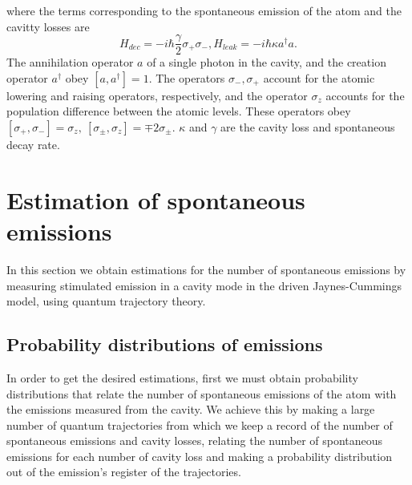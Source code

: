 \documentclass[conference]{IEEEtran}
\begin{document}
where the terms corresponding to the spontaneous emission of the atom and the cavitty losses are
\begin{subequations}
\begin{equation}
H_{dec} = - i\hbar\frac{\gamma}{2}\sigma_+\sigma_-,
\end{equation}
\begin{equation}
H_{leak} = - i\hbar\kappa a^\dagger a.
\end{equation}
\end{subequations}
The annihilation operator $a$ of a single photon in the cavity, and the creation operator $a^\dagger$ obey $[a, a^\dagger] = 1$. The operators $\sigma_-, \sigma_+$  account for the atomic lowering and raising operators, respectively, and the operator $\sigma_z$ accounts for the population difference between the atomic levels. These operators obey $[\sigma_+, \sigma_-] = \sigma_z, \ [\sigma_\pm, \sigma_z] = \mp 2\sigma_\pm$. $\kappa$ and $\gamma$ are the cavity loss and spontaneous decay rate.\\ 

\section{Estimation of spontaneous emissions}
In this section we obtain estimations for the number of spontaneous emissions by measuring stimulated emission in a cavity mode in the driven Jaynes-Cummings model, using quantum trajectory theory.
\subsection{Probability distributions of emissions}
In order to get the desired estimations, first we must obtain probability distributions that relate the number of spontaneous emissions of the atom with the emissions measured from the cavity. We achieve this by making a large number of quantum  trajectories from which we keep a record of the number of spontaneous emissions and cavity losses, relating the number of spontaneous emissions for each number of cavity loss and making a probability distribution out of the emission's register of the trajectories. 
\end{document}
